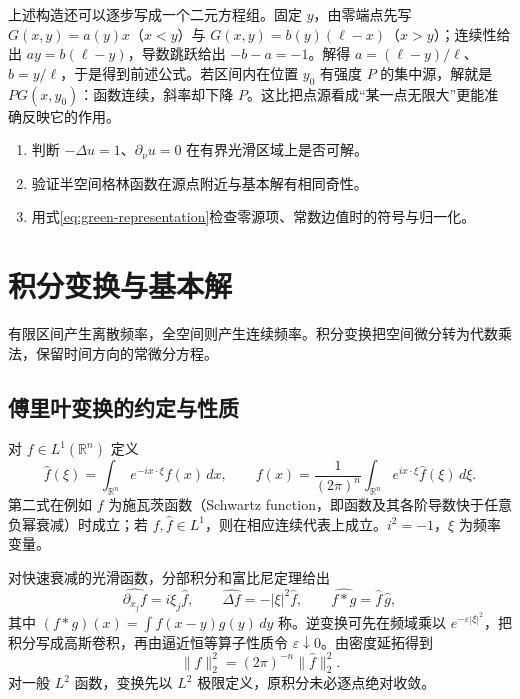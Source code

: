 \documentclass[UTF8,12pt,a4paper,fontset=fandol]{ctexbook}
\begin{document}
上述构造还可以逐步写成一个二元方程组。固定 $y$，由零端点先写 $G(x,y)=a(y)x$（$x<y$）与 $G(x,y)=b(y)(\ell-x)$（$x>y$）；连续性给出 $ay=b(\ell-y)$，导数跳跃给出 $-b-a=-1$。解得 $a=(\ell-y)/\ell$、$b=y/\ell$，于是得到前述公式。若区间内在位置 $y_0$ 有强度 $P$ 的集中源，解就是 $P G(x,y_0)$：函数连续，斜率却下降 $P$。这比把点源看成“某一点无限大”更能准确反映它的作用。
\begin{enumerate}
 \item 判断 $-\Delta u=1$、$\partial_\nu u=0$ 在有界光滑区域上是否可解。
 \item 验证半空间格林函数在源点附近与基本解有相同奇性。
 \item 用式\eqref{eq:green-representation}检查零源项、常数边值时的符号与归一化。
\end{enumerate}

\chapter{积分变换与基本解}
\label{chap:transforms}

有限区间产生离散频率，全空间则产生连续频率。积分变换把空间微分转为代数乘法，保留时间方向的常微分方程。

\section{傅里叶变换的约定与性质}
对 $f\in L^1(\mathbb R^n)$ 定义
\begin{equation}
 \widehat f(\xi)=\int_{\mathbb R^n}e^{-ix\cdot\xi}f(x)\,dx,
 \qquad
 f(x)=\frac1{(2\pi)^n}\int_{\mathbb R^n}e^{ix\cdot\xi}\widehat f(\xi)\,d\xi.
 \label{eq:fourier-convention}
\end{equation}
第二式在例如 $f$ 为施瓦茨函数（Schwartz function，即函数及其各阶导数快于任意负幂衰减）时成立；若 $f,\widehat f\in L^1$，则在相应连续代表上成立。$i^2=-1$，$\xi$ 为频率变量。

对快速衰减的光滑函数，分部积分和富比尼定理给出
\[
 \widehat{\partial_{x_j}f}=i\xi_j\widehat f,\qquad
 \widehat{\Delta f}=-|\xi|^2\widehat f,\qquad
 \widehat{f*g}=\widehat f\,\widehat g,
\]
其中 $(f*g)(x)=\int f(x-y)g(y)\,dy$ 称。逆变换可先在频域乘以 $e^{-\varepsilon|\xi|^2}$，把积分写成高斯卷积，再由逼近恒等算子性质令 $\varepsilon\downarrow0$。由密度延拓得到
\[
 \|f\|_2^2=(2\pi)^{-n}\|\widehat f\|_2^2.
\]
对一般 $L^2$ 函数，变换先以 $L^2$ 极限定义，原积分未必逐点绝对收敛。
\end{document}
